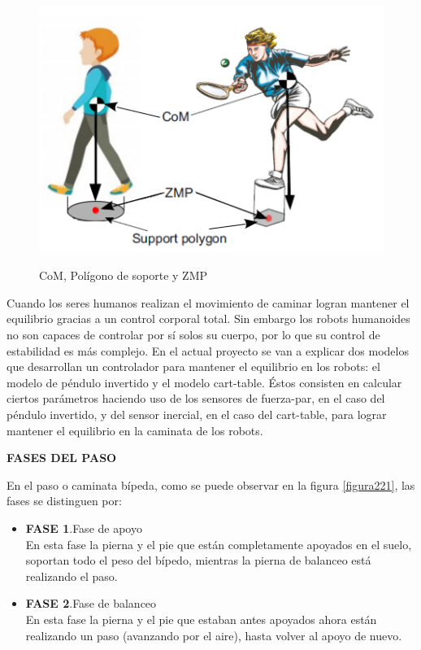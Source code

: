 \begin{figure}[H]
\centering
{\includegraphics[scale=0.45]{imagenes/apartado_2/220_com_zmp_supportpolygon}}
\caption{CoM, Polígono de soporte y ZMP}
\label{figura220}
\end{figure}

Cuando los seres humanos realizan el movimiento de caminar logran mantener el equilibrio gracias a un control corporal total. Sin embargo los robots humanoides no son capaces de controlar por sí solos su cuerpo, por lo que su control de estabilidad es más complejo. En el actual proyecto se van a explicar dos modelos que desarrollan un controlador para mantener el equilibrio en los robots: el modelo de péndulo invertido y el modelo cart-table. Éstos consisten en calcular ciertos parámetros haciendo uso de los sensores de fuerza-par, en el caso del péndulo invertido, y del sensor inercial, en el caso del cart-table, para lograr mantener el equilibrio en la caminata de los robots.

\textbf{FASES DEL PASO}

En el paso o caminata bípeda, como se puede observar en la figura \ref{figura221}, las fases se distinguen por:

\begin{itemize}
\item \textbf{FASE 1}.Fase de apoyo\\
En esta fase la pierna y el pie que están completamente apoyados en el suelo, soportan todo el peso del bípedo, mientras la pierna de balanceo está realizando el paso.

\item \textbf{FASE 2}.Fase de balanceo\\
En esta fase la pierna y el pie que estaban antes apoyados ahora están realizando un paso (avanzando por el aire), hasta volver al apoyo de nuevo. 

\end{itemize}

